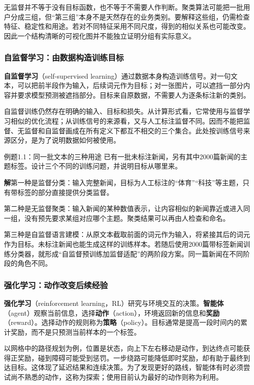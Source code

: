\documentclass[UTF8,fontset=none,zihao=-4,a4paper]{ctexart}
\newcommand{\term}[1]{\textbf{#1}}
\newcommand{\sol}{\par\noindent\textbf{解}\quad}
\numberwithin{equation}{section}
\numberwithin{figure}{section}
\begin{document}
无监督并不等于没有目标函数，也不等于不需要人作判断。聚类算法可能把一批用户分成三组，但“第三组”本身不是天然存在的业务类别。要解释这些组，仍需检查特征、稳定性和用途。若对不同特征采用不同尺度，得到的相似关系也可能改变。因此一个结构清晰的可视化图并不能独立证明分组有实际意义。

\subsubsection{自监督学习：由数据构造训练目标}
\term{自监督学习}（self-supervised learning）通过数据本身构造训练信号。对一句文本，可以把前半段作为输入，后续词元作为目标；对一张图片，可以遮挡一部分内容并要求模型预测被遮挡部分。目标来自原数据，不需要人为逐条标注新的类别。

自监督训练仍然存在明确的输入、目标和损失。从计算形式看，它常使用与监督学习相似的优化流程；从训练信号的来源看，又与人工标注监督不同。因而不能把监督、无监督和自监督画成在所有定义下都互不相交的三个集合。此处按训练信号来源区分，是为了说明数据如何被使用。

\begin{infobox}{例题1.1：同一批文本的三种用途}
已有一批未标注新闻，另有其中2000篇新闻的主题标签。设计三个不同的训练问题，并说明目标从哪里来。
\end{infobox}
\sol 第一种是监督分类：输入完整新闻，目标为人工标注的“体育”“科技”等主题，只有带标签的部分直接提供分类监督。

第二种是无监督聚类：输入新闻的某种数值表示，让内容相似的新闻靠近或进入同一组，没有预先要求某组对应哪个主题。聚类结果可以再由人检查和命名。

第三种是自监督语言建模：从原文本截取前面的词元作为输入，将紧接其后的词元作为目标。未标注新闻也能生成这样的训练样本。若随后使用2000篇带标签新闻训练分类器，就形成“自监督预训练加监督适配”的两阶段方案。同一篇新闻在不同阶段的角色不同。

\subsubsection{强化学习：动作改变后续经验}
\term{强化学习}（reinforcement learning，RL）研究与环境交互的决策。\term{智能体}（agent）观察当前信息，选择\term{动作}（action），环境返回新的信息和\term{奖励}（reward）。选择动作的规则称为\term{策略}（policy）。目标通常是提高一段时间内的累计奖励，而不是只预测当前样本的一个标签。

以网格中的路径规划为例，位置是状态，向上下左右移动是动作，到达终点可能获得正奖励，碰到障碍可能受到惩罚。一步绕路可能降低即时奖励，却有助于最终到达目标。这体现了延迟结果和连续决策。为了发现更好的路线，智能体有时必须尝试尚不熟悉的动作，这称为探索；使用目前认为最好的动作则称为利用。
\end{document}
